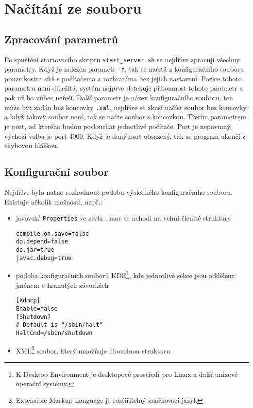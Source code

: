 \section{Načítání ze souboru}
\subsection{Zpracování parametrů}
Po spuštění startovacího skriptu \verb|start_server.sh| se nejdříve zpracují všechny parametry. Když je nalezen parametr \verb|-n|, tak se načítá z konfiguračního souboru pouze kostra sítě s počítačema a rozhraníma bez jejich nastavení. Pozice tohoto parametru není důležitá, systém nejprve detekuje přítomnost tohoto parametr a pak už ho vůbec neřeší. Další parametr je název konfiguračního souboru, ten může být zadán bez koncovky \verb|.xml|, nejdříve se zkusí načíst soubor bez koncovky a když takový soubor není, tak se načte soubor s koncovkou. Třetím parametrem je port, od kterého budou poslouchat jednotlivé počítače. Port je nepovinný, výchozí volba je port 4000. Když je daný port obsazený, tak se program ukončí z chybovou hláškou.


\subsection{Konfigurační soubor}
Nejdříve bylo nutno rozhodnout podobu výsledného konfiguračního souboru. Existuje několik možností, např.:
\begin{itemize}
 \item javovské \verb|Properties| ve stylu , moc se nehodí na velmi členité struktury
\begin{verbatim}
compile.on.save=false
do.depend=false
do.jar=true
javac.debug=true
\end{verbatim} 

 \item podoba konfiguračních souborů KDE\footnote{K Desktop Environment je desktopové prostředí pro Linux a další unixové operační systémy.}, kde jednotlivé sekce jsou odděleny jménem v hranatých závorkách
\begin{verbatim}
[Xdmcp]
Enable=false
[Shutdown]
# Default is "/sbin/halt"
HaltCmd=/sbin/shutdown
\end{verbatim} 

 \item XML\footnote{Extensible Markup Language je rozšiřitelný značkovací jazyk} soubor, který umožňuje libovolnou strukturu
\end{itemize}

